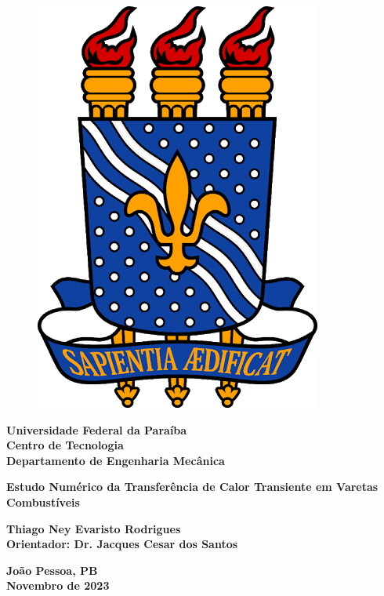 \begin{titlepage}
    \begin{center}
        \begin{figure}[H]
            \centering
            \includegraphics[scale=0.125]{figures/others/ufpb.png}
        \end{figure}
        
        {\large
        \textbf{Universidade Federal da Paraíba \\
        Centro de Tecnologia \\
        Departamento de Engenharia Mecânica \\}}
        
        \vspace{5cm}
        
        {\Large
        \textbf{Estudo Numérico da Transferência de Calor Transiente em Varetas Combustíveis}}
        
        \vspace{5cm}
        
        {\large
        \textbf{
        Thiago Ney Evaristo Rodrigues \\
        Orientador: Dr. Jacques Cesar dos Santos \\}}
        
        \vspace{3cm}
        
        {\large
        \textbf{
        João Pessoa, PB \\
        Novembro de 2023 \\}}
    \end{center}
\end{titlepage}